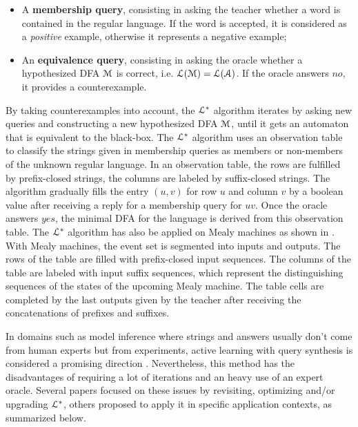 \begin{itemize}
    \item A \textbf{membership query}, consisting in asking the
        teacher whether a word is contained in the regular
        language.  If the word is accepted, it is considered as a
        \textit{positive} example, otherwise it represents a
        negative example;

    \item An \textbf{equivalence query}, consisting in asking the
        oracle whether a hypothesized DFA $\EuScript{M}$ is
        correct, i.e. $\EuScript{L}(\EuScript{M}) =
        \EuScript{L}(\EuScript{A})$. If the oracle answers $no$,
        it provides a counterexample.
\end{itemize}

By taking counterexamples into account, the $\EuScript{L}^*$
algorithm iterates by asking new queries and constructing a new
hypothesized DFA $\EuScript{M}$, until it gets an automaton that
is equivalent to the black-box. The $\EuScript{L}^*$ algorithm
uses an observation table to classify the strings given in
membership queries as members or non-members of the unknown
regular language. In an observation table, the rows are fulfilled
by prefix-closed strings, the columns are labeled by
suffix-closed strings. The algorithm gradually fills the entry
$(u,v)$ for row $u$ and column $v$ by a boolean value after
receiving a reply for a membership query for $uv$. Once the
oracle answers $yes$, the minimal DFA for the language is derived
from this observation table. The $\EuScript{L}^*$
algorithm has also be applied on Mealy machines as shown in
\cite{DBLP:phd/de/Niese2003,steffen11}. With Mealy machines, the
event set is segmented into inputs and outputs. The rows of the
table are filled with prefix-closed input sequences. The columns
of the table are labeled with input suffix sequences, which
represent the distinguishing sequences of the states of the
upcoming Mealy machine. The table cells are completed by the last
outputs given by the teacher after receiving the concatenations
of prefixes and suffixes.

In domains such as model inference where strings and answers
usually don't come from human experts but from experiments,
active learning with query synthesis is considered a promising
direction \cite{settles.tr09}. Nevertheless, this method has the
disadvantages of requiring a lot of iterations and an heavy use
of an expert oracle. Several papers focused on these issues by
revisiting, optimizing and/or upgrading $\EuScript{L}^*$, others
proposed to apply it in specific application contexts, as
summarized below.


